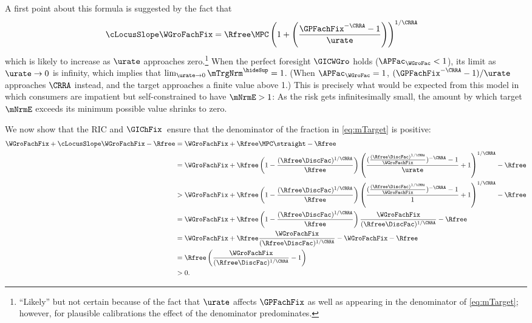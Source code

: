 \documentclass{econark}
\begin{document}
A first point about this formula is suggested by the fact that
\begin{equation}\begin{gathered}\begin{aligned}
  \cLocusSlope\WGroFachFix & =  \Rfree \MPC \left(1+\left(\frac{\GPFachFix^{-\CRRA} - 1}{\urate}\right)\right)^{1/\CRRA}
\end{aligned}\end{gathered}\end{equation}
which is likely to increase as $\urate$ approaches zero.\footnote{``Likely'' but not certain because of the fact that $\urate$ affects $\GPFachFix$ as well as
  appearing in the denominator of \eqref{eq:mTarget}; however, for
  plausible calibrations the effect of the denominator predominates.}
When the perfect foresight $\GICWGro$ holds ($\APFac_{\WGroFac} < 1$), its limit as $\urate \rightarrow 0$ is infinity, which
implies that $\lim_{\urate \rightarrow 0} \mTrgNrm^{\hideSup} = 1$.  (When $\APFac_{\WGroFac} = 1$, $(\GPFachFix^{-\CRRA}-1)/\urate$ approaches $\CRRA$ instead, and the target approaches a finite value above 1.)  This is precisely what would be expected from
this model in which consumers are impatient but self-constrained to
have $\mNrmE > 1$:  As the risk gets infinitesimally small, the
amount by which target $\mNrmE$ exceeds its minimum possible value shrinks to
zero.

We now show that the RIC and $\GIChFix$~ensure that the denominator of the fraction in \eqref{eq:mTarget} is positive: 
\begin{equation}\begin{gathered}\begin{aligned}
\WGroFachFix + \cLocusSlope \WGroFachFix - \Rfree & =  \WGroFachFix + \Rfree \MPC \straight - \Rfree
 \\& =  \WGroFachFix + \Rfree \left(1- \frac{(\Rfree \DiscFac)^{1/\CRRA}}{\Rfree}\right) \left(\frac{(\frac{(\Rfree\DiscFac)^{1/\CRRA}}{\WGroFachFix})^{-\CRRA}-1}{\urate}+1\right)^{1/\CRRA}-\Rfree
 \\& >   \WGroFachFix+\Rfree \left(1-\frac{(\Rfree\DiscFac)^{1/\CRRA}}{\Rfree}\right)
\left(\frac{(\frac{(\Rfree\DiscFac)^{1/\CRRA}}{\WGroFachFix})^{-\CRRA}-1}{1}+1\right)^{1/\CRRA}-\Rfree
 \\& =  \WGroFachFix+\Rfree\left(1-\frac{(\Rfree\DiscFac)^{1/\CRRA}}{\Rfree}\right)\frac{\WGroFachFix}{(\Rfree\DiscFac)^{1/\CRRA}}-\Rfree
 \\& =  \WGroFachFix+\Rfree \frac{\WGroFachFix}{(\Rfree\DiscFac)^{1/\CRRA}}- \WGroFachFix - \Rfree
 \\& =  \Rfree \left(\frac{\WGroFachFix}{(\Rfree\DiscFac)^{1/\CRRA}}-1\right)
 \\& >  0.
\end{aligned}\end{gathered}\end{equation}
\end{document}
